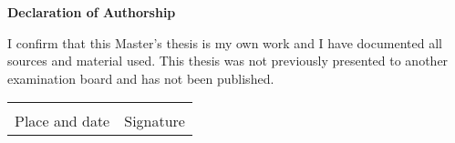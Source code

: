 \setlength{\parindent}{0em}
\begin{titlepage}
\thispagestyle{empty}
\begin{center}
	\begin{minipage}[c][0.48\textheight][b]{0.9\textwidth}
		\small
			\textbf{Declaration of Authorship}\par
		\vspace{\baselineskip}
			I confirm that this	Master's thesis is my own work and I have documented all sources and material used. This thesis was not previously presented to another examination board and has not been published.\par			 
   		    \vspace{5\baselineskip}
			\noindent\begin{tabular}{ll}
				\makebox[2.5in]{\hrulefill} & \makebox[2.5in]{\hrulefill}\\
				Place and date & Signature\\
			\end{tabular}
			
	\end{minipage} \par \par
\end{center}
\end{titlepage}